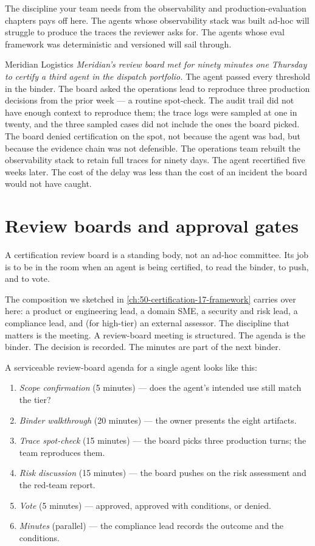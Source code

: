 The discipline your team needs from the observability and production-evaluation chapters pays off here. The agents whose observability stack was built ad-hoc will struggle to produce the traces the reviewer asks for. The agents whose eval framework was deterministic and versioned will sail through.

\begin{TNinpractice}{Meridian Logistics} \textit{Meridian's review board met for ninety minutes one Thursday to certify a third agent in the dispatch portfolio.} The agent passed every threshold in the binder. The board asked the operations lead to reproduce three production decisions from the prior week --- a routine spot-check. The audit trail did not have enough context to reproduce them; the trace logs were sampled at one in twenty, and the three sampled cases did not include the ones the board picked. The board denied certification on the spot, not because the agent was bad, but because the evidence chain was not defensible. The operations team rebuilt the observability stack to retain full traces for ninety days. The agent recertified five weeks later. The cost of the delay was less than the cost of an incident the board would not have caught. \end{TNinpractice}

\section{Review boards and approval gates}

A certification review board is a standing body, not an ad-hoc committee. Its job is to be in the room when an agent is being certified, to read the binder, to push, and to vote.

The composition we sketched in \autoref{ch:50-certification-17-framework} carries over here: a product or engineering lead, a domain SME, a security and risk lead, a compliance lead, and (for high-tier) an external assessor. The discipline that matters is the meeting. A review-board meeting is structured. The agenda is the binder. The decision is recorded. The minutes are part of the next binder.

A serviceable review-board agenda for a single agent looks like this:

\begin{enumerate}
\item \textit{Scope confirmation} (5 minutes) --- does the agent's intended use still match the tier?
\item \textit{Binder walkthrough} (20 minutes) --- the owner presents the eight artifacts.
\item \textit{Trace spot-check} (15 minutes) --- the board picks three production turns; the team reproduces them.
\item \textit{Risk discussion} (15 minutes) --- the board pushes on the risk assessment and the red-team report.
\item \textit{Vote} (5 minutes) --- approved, approved with conditions, or denied.
\item \textit{Minutes} (parallel) --- the compliance lead records the outcome and the conditions.
\end{enumerate}

